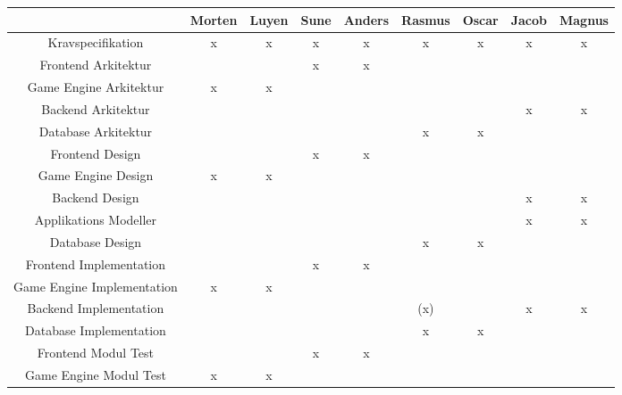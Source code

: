 \begin{center}
  \begin{longtable}{|c|c|c|c|c|c|c|c|c|}
    \hline
                                & Morten & Luyen & Sune  & Anders & Rasmus & Oscar & Jacob & Magnus \\ \hline
    Kravspecifikation           & x      & x     & x     & x      & x      & x     & x     & x      \\ \hline
    Frontend Arkitektur         &        &       & x     & x      &        &       &       &        \\ \hline
    Game Engine Arkitektur      & x      & x     &       &        &        &       &       &        \\ \hline
    Backend Arkitektur          &        &       &       &        &        &       & x     & x      \\ \hline
    Database Arkitektur         &        &       &       &        & x      & x     &       &        \\ \hline
    Frontend Design             &        &       & x     & x      &        &       &       &        \\ \hline
    Game Engine Design          & x      & x     &       &        &        &       &       &        \\ \hline
    Backend Design              &        &       &       &        &        &       & x     & x      \\ \hline
    Applikations Modeller       &        &       &       &        &        &       & x     & x      \\ \hline
    Database Design             &        &       &       &        & x      & x     &       &        \\ \hline
    Frontend Implementation     &        &       & x     & x      &        &       &       &        \\ \hline
    Game Engine Implementation  & x      & x     &       &        &        &       &       &        \\ \hline
    Backend Implementation      &        &       &       &        &(x)       &       & x     & x      \\ \hline
    Database Implementation     &        &       &       &        & x      & x     &       &        \\ \hline
    Frontend Modul Test         &        &       & x     & x      &        &       &       &        \\ \hline
    Game Engine Modul Test      & x      & x     &       &        &        &       &       &        \\ \hline

\end{longtable}
\end{center}
